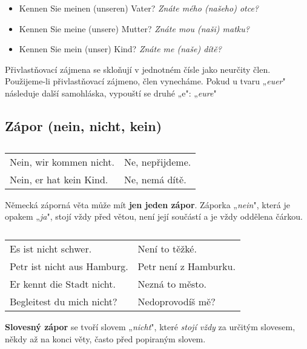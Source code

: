       \begin{itemize}[noitemsep] %
        \item Kennen Sie meinen (unseren) Vater? \emph{Znáte mého (našeho) otce?}
        \item Kennen Sie meine (unsere) Mutter? \emph{Znáte mou (naši) matku?} 
        \item Kennen Sie mein (unser) Kind? \emph{Znáte me (naše) dítě?}
      \end{itemize}
      Přivlastňovací zájmena se skloňují v jednotném čísle jako neurčity člen. Použijeme-li 
      přivlastňovací zájmeno, člen vynecháme. Pokud u tvaru „\emph{euer}" následuje další 
      samohláska, vypouští se druhé „e": „\emph{eure}"
  
    \subsection*{Zápor (nein, nicht, kein)}  %
      \begin{table}[ht!]  
        \begin{tabular}{ll} 
          Nein, wir kommen nicht. & Ne, nepřijdeme. \\
          Nein, er hat kein Kind. & Ne, nemá dítě.
        \end{tabular}
        \caption*{ }
      \end{table}
      Německá záporná věta může mít \textbf{jen jeden zápor}. Záporka „\emph{nein}", která je 
      opakem „\emph{ja}", stojí vždy před větou, není její součástí a je vždy oddělena čárkou.
      
      \begin{table}[ht!]   
        \begin{tabular}{ll} 
          Es ist nicht schwer.        & Není to těžké.        \\ 
          Petr ist nicht aus Hamburg. & Petr není z Hamburku. \\
          Er kennt die Stadt nicht.   & Nezná to město.       \\
          Begleitest du mich nicht?   & Nedoprovodíš mě?
        \end{tabular}
        \caption*{ }
      \end{table}
      \textbf{Slovesný zápor} se tvoří slovem „\emph{nicht}", které \emph{stojí vždy} za určitým 
      slovesem, někdy až na konci věty, často před popiraným slovem.
  
